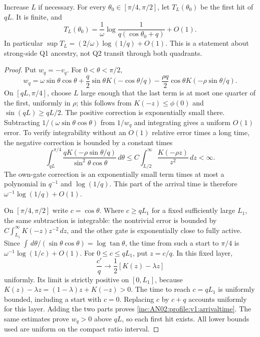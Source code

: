 \documentclass[11pt]{article}
\numberwithin{equation}{section}
\theoremstyle{remark}\newtheorem{remark}[theorem]{Remark}
\newcommand{\dd}{\,d}\newcommand{\E}{\mathbb E}\newcommand{\R}{\mathbb R}
\begin{document}
\begin{lemma}\label{inc:AN02:profile:v1:arrival}
Increase $L$ if necessary. For every $\theta_0\in[\pi/4,\pi/2]$, let $T_L(\theta_0)$ be the first hit of $qL$. It is finite, and
\begin{equation}\label{inc:AN02:profile:v1:arrivaltime}
 T_L(\theta_0)=\frac1\omega\log\frac1{q(\cos\theta_0+q)}+O(1).
\end{equation}
In particular $\sup T_L=(2/\omega)\log(1/q)+O(1)$. This is a statement about strong-side Q1 ancestry, not Q2 transit through both quadrants.
\end{lemma}
\begin{proof}
Put $w_q=-v_q$. For $0<\theta<\pi/2$,
\begin{equation}\label{inc:AN02:profile:v1:outerdecomposition}
 w_q=\omega\sin\theta\cos\theta
 +\frac q2\sin\theta K(-\cos\theta/q)
 -\frac{\rho q}{2}\cos\theta K(-\rho\sin\theta/q).
\end{equation}
On $[qL,\pi/4]$, choose $L$ large enough that the last term is at most one quarter of the first, uniformly in $\rho$; this follows from $K(-z)\le\phi(0)$ and $\sin(qL)\ge qL/2$. The positive correction is exponentially small there. Subtracting $1/(\omega\sin\theta\cos\theta)$ from $1/w_q$ and integrating gives a uniform $O(1)$ error. To verify integrability without an $O(1)$ relative error times a long time, the negative correction is bounded by a constant times
\[
 \int_{qL}^{\pi/4}\frac{qK(-\rho\sin\theta/q)}{\sin^2\theta\cos\theta}\dd\theta
 \le C\int_{L/2}^\infty\frac{K(-\rho z)}{z^2}\dd z<\infty.
\]
The own-gate correction is an exponentially small term times at most a polynomial in $q^{-1}$ and $\log(1/q)$. This part of the arrival time is therefore $\omega^{-1}\log(1/q)+O(1)$.

On $[\pi/4,\pi/2]$ write $c=\cos\theta$. Where $c\ge qL_1$ for a fixed sufficiently large $L_1$, the same subtraction is integrable: the nontrivial error is bounded by $C\int_{L_1}^\infty K(-z)z^{-2}\dd z$, and the other gate is exponentially close to fully active. Since $\int\dd\theta/(\sin\theta\cos\theta)=\log\tan\theta$, the time from such a start to $\pi/4$ is $\omega^{-1}\log(1/c)+O(1)$.
For $0\le c\le qL_1$, put $z=c/q$. In this fixed layer,
\[
 \frac{c'}q\longrightarrow\frac12[K(z)-\lambda z]
\]
uniformly. Its limit is strictly positive on $[0,L_1]$, because $K(z)-\lambda z=(1-\lambda)z+K(-z)>0$. The time to reach $c=qL_1$ is uniformly bounded, including a start with $c=0$. Replacing $c$ by $c+q$ accounts uniformly for this layer. Adding the two parts proves \eqref{inc:AN02:profile:v1:arrivaltime}. The same estimates prove $w_q>0$ above $qL$, so each first hit exists. All lower bounds used are uniform on the compact ratio interval.
\end{proof}
\end{document}
